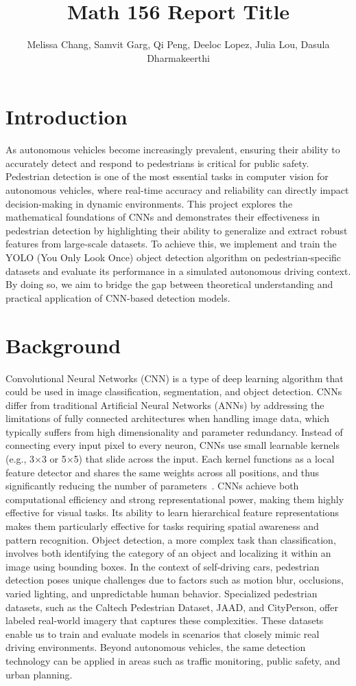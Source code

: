 \documentclass[11pt]{article}
\title{Math 156 Report Title}
\author{Melissa Chang, Samvit Garg, Qi Peng, Deeloc Lopez, Julia Lou, Dasula Dharmakeerthi}
\date{}
\begin{document}
\maketitle
\abstract{\blindtext}
\section{Introduction}
As autonomous vehicles become increasingly prevalent, ensuring their ability to accurately detect and respond to pedestrians is critical for public safety\cite{martinez2018autonomous}. Pedestrian detection is one of the most essential tasks in computer vision for autonomous vehicles, where real-time accuracy and reliability can directly impact decision-making in dynamic environments. This project explores the mathematical foundations of CNNs and demonstrates their effectiveness in pedestrian detection by highlighting their ability to generalize and extract robust features from large-scale datasets\cite{hasan2022pedestrian}. To achieve this, we implement and train the YOLO (You Only Look Once) object detection algorithm on pedestrian-specific datasets and evaluate its performance in a simulated autonomous driving context. By doing so, we aim to bridge the gap between theoretical understanding and practical application of CNN-based detection models.
\section{Background}
Convolutional Neural Networks (CNN) is a type of deep learning algorithm that could be used in image classification, segmentation, and object detection. CNNs differ from traditional Artificial Neural Networks (ANNs) by addressing the limitations of fully connected architectures when handling image data, which typically suffers from high dimensionality and parameter redundancy. Instead of connecting every input pixel to every neuron, CNNs use small learnable kernels (e.g., 3×3 or 5×5) that slide across the input. Each kernel functions as a local feature detector and shares the same weights across all positions, and thus significantly reducing the number of parameters~\cite{oshea2015introduction}. CNNs achieve both computational efficiency and strong representational power, making them highly effective for visual tasks. Its ability to learn hierarchical feature representations makes them particularly effective for tasks requiring spatial awareness and pattern recognition\cite{li2021survey}. Object detection, a more complex task than classification, involves both identifying the category of an object and localizing it within an image using bounding boxes. In the context of self-driving cars, pedestrian detection poses unique challenges due to factors such as motion blur, occlusions, varied lighting, and unpredictable human behavior. Specialized pedestrian datasets, such as the Caltech Pedestrian Dataset, JAAD, and CityPerson, offer labeled real-world imagery that captures these complexities. These datasets enable us to train and evaluate models in scenarios that closely mimic real driving environments. Beyond autonomous vehicles, the same detection technology can be applied in areas such as traffic monitoring, public safety, and urban planning.
\end{document}
